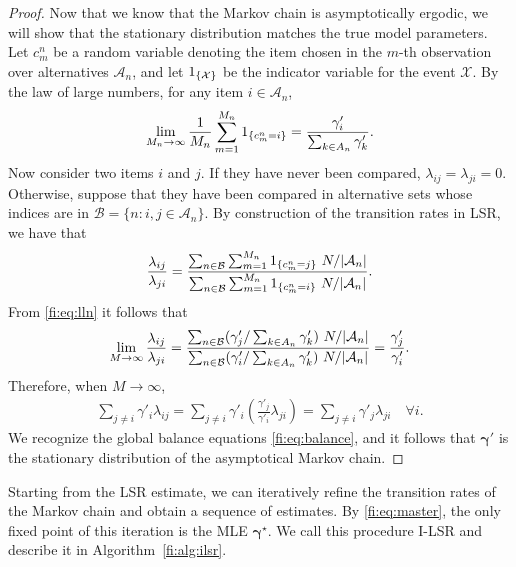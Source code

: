 \begin{proof}
Now that we know that the Markov chain is asymptotically ergodic, we will show that the stationary distribution matches the true model parameters.
Let $c^n_m$ be a random variable denoting the item chosen in the $m$-th observation over alternatives $\mathcal{A}_n$, and let
$1_{\left \{ \mathcal{X} \right \} }$ be the indicator variable for the event $\mathcal{X}$.
By the law of large numbers, for any item $i \in \mathcal{A}_n$,
\begin{align}
\label{fi:eq:lln}
\lim_{M_n \to \infty} \frac{1}{M_n} \sum_{m = 1}^{M_n} 1_{\left \{ c^n_m = i \right \} } = \frac{\gamma'_i}{\sum_{k \in A_n} \gamma'_k}.
\end{align}
Now consider two items $i$ and $j$.
If they have never been compared, $\lambda_{ij} = \lambda_{ji} = 0$.
Otherwise, suppose that they have been compared in alternative sets whose indices are in $\mathcal{B} = \{ n : i, j \in \mathcal{A}_n \}$.
By construction of the transition rates in LSR, we have that
\begin{align*}
\frac{\lambda_{ij}}{\lambda_{ji}}
= \frac{\sum_{n \in \mathcal{B}} \sum_{m = 1}^{M_n} \Indic{c^n_m = j} \ N / \Abs{\mathcal{A}_n}}
       {\sum_{n \in \mathcal{B}} \sum_{m = 1}^{M_n} \Indic{c^n_m = i} \ N / \Abs{\mathcal{A}_n}}.
\end{align*}
From \eqref{fi:eq:lln} it follows that
\begin{align*}
\lim_{M \to \infty}\frac{\lambda_{ij}}{\lambda_{ji}}
    = \frac{\sum_{n \in \mathcal{B}} (\gamma'_j / \sum_{k \in A_n} \gamma'_k) \ N / \lvert\mathcal{A}_n\rvert}
         {\sum_{n \in \mathcal{B}} (\gamma'_i / \sum_{k \in A_n} \gamma'_k) \ N / \lvert\mathcal{A}_n\rvert}
    = \frac{\gamma'_j }{\gamma'_i}.
\end{align*}
Therefore, when $M \to \infty$,
\begin{align*}
\sum_{j \ne i} \gamma'_i \lambda_{ij} = \sum_{j \ne i} \gamma'_i \left( \frac{\gamma'_j}{\gamma'_i} \lambda_{ji} \right)
                                    = \sum_{j \ne i} \gamma'_j \lambda_{ji}  \quad \forall i.
\end{align*}
We recognize the global balance equations \eqref{fi:eq:balance}, and it follows that $\bm{\gamma}'$ is the stationary distribution of the asymptotical Markov chain.
\end{proof}

Starting from the LSR estimate, we can iteratively refine the transition rates of the Markov chain and obtain a sequence of estimates.
By \eqref{fi:eq:master}, the only fixed point of this iteration is the MLE $\bm{\gamma}^\star$.
We call this procedure I-LSR and describe it in Algorithm~\ref{fi:alg:ilsr}.

